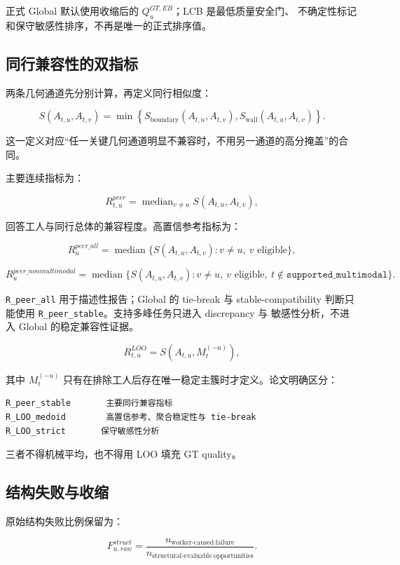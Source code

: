 正式 Global 默认使用收缩后的 \(Q^{GT,EB}_u\)；LCB 是最低质量安全门、
不确定性标记和保守敏感性排序，不再是唯一的正式排序值。

\subsection{同行兼容性的双指标}

两条几何通道先分别计算，再定义同行相似度：

\[
S(A_{t,u},A_{t,v})
=\min\left\{S_{\mathrm{boundary}}(A_{t,u},A_{t,v}),
S_{\mathrm{wall}}(A_{t,u},A_{t,v})\right\}.
\]

这一定义对应“任一关键几何通道明显不兼容时，不用另一通道的高分掩盖”的合同。

主要连续指标为：

\[
R^{peer}_{t,u}=\operatorname{median}_{v\neq u}
S(A_{t,u},A_{t,v}),
\]

回答工人与同行总体的兼容程度。高置信参考指标为：

\[
R^{peer\_all}_u=\operatorname{median}\{S(A_{t,u},A_{t,v}):
v\neq u,\ v\text{ eligible}\},
\]

\[
R^{peer\_nonmultimodal}_u=\operatorname{median}\{S(A_{t,u},A_{t,v}):
v\neq u,\ v\text{ eligible},\
t\notin\texttt{supported\_multimodal}\}.
\]

\texttt{R\_peer\_all} 用于描述性报告；Global 的 tie-break 与 stable-compatibility
判断只能使用 \texttt{R\_peer\_stable}。支持多峰任务只进入 discrepancy 与
敏感性分析，不进入 Global 的稳定兼容性证据。

\[
R^{LOO}_{t,u}=S(A_{t,u},M_t^{(-u)}),
\]

其中 \(M_t^{(-u)}\) 只有在排除工人后存在唯一稳定主簇时才定义。论文明确区分：

\begin{verbatim}
R_peer_stable       主要同行兼容指标
R_LOO_medoid        高置信参考、聚合稳定性与 tie-break
R_LOO_strict       保守敏感性分析
\end{verbatim}

三者不得机械平均，也不得用 LOO 填充 GT quality。

\subsection{结构失败与收缩}

原始结构失败比例保留为：

\[
F^{struct}_{u,raw}=\frac{n_{\mathrm{worker\text{-}caused\ failure}}}
{n_{\mathrm{structural\text{-}evaluable\ opportunities}}}.
\]

